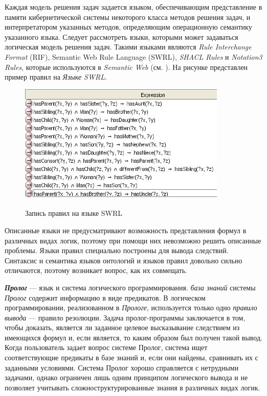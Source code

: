 Каждая модель решения задач задается языком, обеспечивающим представление в памяти кибернетической системы некоторого класса методов решения задач, и интерпретатором указанных методов, определяющим операционную семантику указанного языка. Следует рассмотреть языки, которыми может задаваться логическая модель решения задач. Такими языками являются \textit{Rule Interchange Format} (RIF), Semantic Web Rule Language (SWRL), \textit{SHACL Rules} и \textit{Notation3 Rules}, которые используются в \textit{Semantic Web} (см. ). На рисунке  представлен пример правил на \textit{Языке SWRL}.

\begin{figure}[H]
	\caption{Запись правил на языке SWRL}
	\includegraphics[scale=0.8]{author/part3/figures/swrl_example.png}
	\label{fig:swrl_example}
\end{figure}

Описанные языки не предусматривают возможность представления формул в различных видах логик, поэтому при помощи них невозможно решить описанные проблемы. Языки правил специально построены для вывода следствий. Синтаксис и семантика языков онтологий и языков правил довольно сильно отличаются, поэтому возникает вопрос, как их совмещать. 

\textbf{\textit{Пролог}} --- язык и система логического программирования. \textit{база знаний} системы \textit{Пролог} содержит информацию в виде предикатов. В логическом программировании, реализованном в \textit{Прологе}, используется только одно \textit{правило вывода} --- правило резолюции. Задача пролог-программы заключается в том, чтобы доказать, является ли заданное целевое высказывание следствием из имеющихся формул и, если является, то каким образом был получен такой вывод. Когда пользователь задает вопрос системе Пролог, система ищет соответствующие предикаты в базе знаний и, если они найдены, сравнивать их с заданными условиями. Система Пролог хорошо справляется с нетрудными задачами, однако ограничен лишь одним принципом логического вывода и не позволяет учитывать сложноструктурированные знания в различных видах логик.

